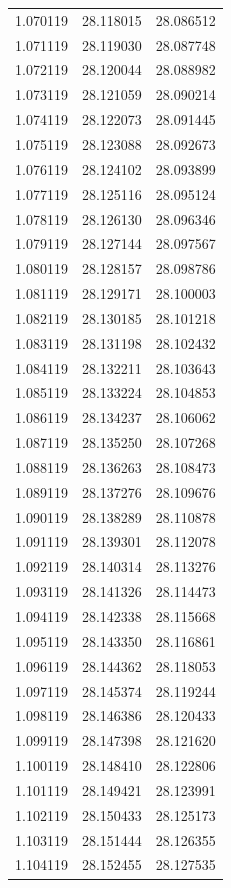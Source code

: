 \begin{tabular}{rrr}
1.070119 & 28.118015 & 28.086512 \\
1.071119 & 28.119030 & 28.087748 \\
1.072119 & 28.120044 & 28.088982 \\
1.073119 & 28.121059 & 28.090214 \\
1.074119 & 28.122073 & 28.091445 \\
1.075119 & 28.123088 & 28.092673 \\
1.076119 & 28.124102 & 28.093899 \\
1.077119 & 28.125116 & 28.095124 \\
1.078119 & 28.126130 & 28.096346 \\
1.079119 & 28.127144 & 28.097567 \\
1.080119 & 28.128157 & 28.098786 \\
1.081119 & 28.129171 & 28.100003 \\
1.082119 & 28.130185 & 28.101218 \\
1.083119 & 28.131198 & 28.102432 \\
1.084119 & 28.132211 & 28.103643 \\
1.085119 & 28.133224 & 28.104853 \\
1.086119 & 28.134237 & 28.106062 \\
1.087119 & 28.135250 & 28.107268 \\
1.088119 & 28.136263 & 28.108473 \\
1.089119 & 28.137276 & 28.109676 \\
1.090119 & 28.138289 & 28.110878 \\
1.091119 & 28.139301 & 28.112078 \\
1.092119 & 28.140314 & 28.113276 \\
1.093119 & 28.141326 & 28.114473 \\
1.094119 & 28.142338 & 28.115668 \\
1.095119 & 28.143350 & 28.116861 \\
1.096119 & 28.144362 & 28.118053 \\
1.097119 & 28.145374 & 28.119244 \\
1.098119 & 28.146386 & 28.120433 \\
1.099119 & 28.147398 & 28.121620 \\
1.100119 & 28.148410 & 28.122806 \\
1.101119 & 28.149421 & 28.123991 \\
1.102119 & 28.150433 & 28.125173 \\
1.103119 & 28.151444 & 28.126355 \\
1.104119 & 28.152455 & 28.127535 \\

\end{tabular}
